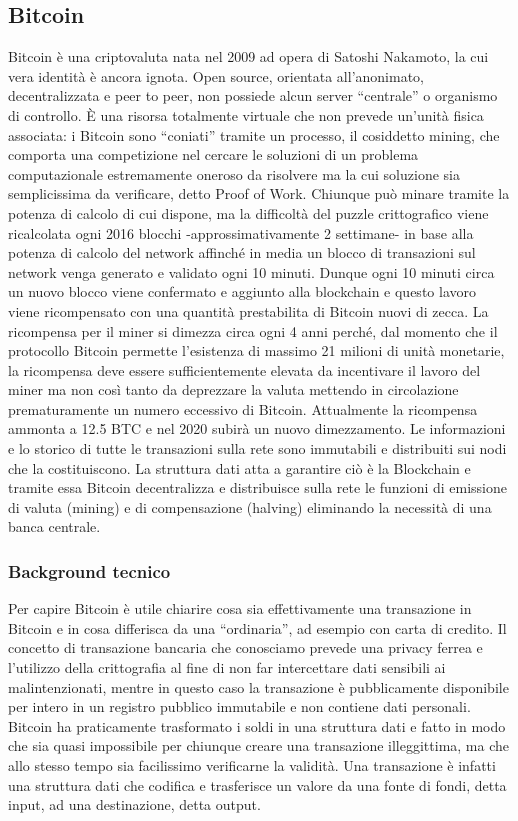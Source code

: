 \subsection{Bitcoin}
Bitcoin è una criptovaluta nata nel 2009 ad opera di Satoshi Nakamoto, la cui vera identità è ancora ignota. Open source, orientata all’anonimato, decentralizzata e peer to peer, non possiede alcun server “centrale” o organismo di controllo. È una risorsa totalmente virtuale che non prevede un’unità fisica associata: i Bitcoin sono “coniati” tramite un processo, il cosiddetto mining, che comporta una competizione nel cercare le soluzioni di un problema computazionale estremamente oneroso da risolvere ma la cui soluzione sia semplicissima da verificare, detto Proof of Work.
Chiunque può minare tramite la potenza di calcolo di cui dispone, ma la difficoltà del puzzle crittografico viene ricalcolata ogni 2016 blocchi -approssimativamente 2 settimane- in base alla potenza di calcolo del network affinché in media un blocco di transazioni sul network venga generato e validato ogni 10 minuti. Dunque ogni 10 minuti circa un nuovo blocco viene confermato e aggiunto alla blockchain e questo lavoro viene ricompensato con una quantità prestabilita di Bitcoin nuovi di zecca. 
La ricompensa per il miner si dimezza circa ogni 4 anni perché, dal momento che il protocollo Bitcoin permette l’esistenza di massimo 21 milioni di unità monetarie, la ricompensa deve essere sufficientemente elevata da incentivare il lavoro del miner ma non così tanto da deprezzare la valuta mettendo in circolazione prematuramente un numero eccessivo di Bitcoin. Attualmente la ricompensa ammonta a 12.5 BTC e nel 2020 subirà un nuovo dimezzamento.
Le informazioni e lo storico di tutte le transazioni sulla rete sono immutabili e distribuiti sui nodi che la costituiscono. La struttura dati atta a garantire ciò è la Blockchain e tramite essa Bitcoin decentralizza e distribuisce sulla rete le funzioni di emissione di valuta (mining) e di compensazione (halving) eliminando la necessità di una banca centrale.



\subsubsection{Background tecnico}
Per capire Bitcoin è utile chiarire cosa sia effettivamente una transazione in Bitcoin e in cosa differisca da una “ordinaria”, ad esempio con carta di credito. Il concetto di transazione bancaria che conosciamo prevede una privacy ferrea e l’utilizzo della crittografia al fine di non far intercettare dati sensibili ai malintenzionati, mentre in questo caso la transazione è pubblicamente disponibile per intero in un registro pubblico immutabile e non contiene dati personali. Bitcoin ha praticamente trasformato i soldi in una struttura dati e fatto in modo che sia quasi impossibile per chiunque creare una transazione illeggittima, ma che allo stesso tempo sia facilissimo verificarne la validità. Una transazione è infatti una struttura dati che codifica e trasferisce un valore da una fonte di fondi, detta input, ad una destinazione, detta output.

